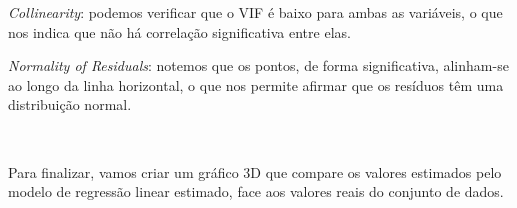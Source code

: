 \documentclass[]{article}
\begin{document}
\emph{Collinearity}: podemos verificar que o VIF é baixo para ambas as
variáveis, o que nos indica que não há correlação significativa entre
elas.

\emph{Normality of Residuals}: notemos que os pontos, de forma
significativa, alinham-se ao longo da linha horizontal, o que nos
permite afirmar que os resíduos têm uma distribuição normal.

\(\ \)

Para finalizar, vamos criar um gráfico 3D que compare os valores
estimados pelo modelo de regressão linear estimado, face aos valores
reais do conjunto de dados.

\begin{Shaded}
\begin{Highlighting}[]

\OtherTok{\textless{}{-}} \SpecialCharTok{$}\SpecialCharTok{*} 
\OtherTok{\textless{}{-}} \SpecialCharTok{$}\SpecialCharTok{*} 
\OtherTok{\textless{}{-}} \SpecialCharTok{$}\SpecialCharTok{*} 
\OtherTok{\textless{}{-}} \SpecialCharTok{$}\SpecialCharTok{*} 

\OtherTok{\textless{}{-}} 
                        \NormalTok{(} 
                                             

\OtherTok{\textless{}{-}} \NormalTok{(}
                      \NormalTok{, } \NormalTok{, } \NormalTok{,}
                      \NormalTok{, } \NormalTok{, } \NormalTok{,}
                      \NormalTok{(}\SpecialCharTok{$}\SpecialCharTok{*}\NormalTok{, }\SpecialCharTok{$}\SpecialCharTok{*}\NormalTok{),}
                      \NormalTok{, } \NormalTok{)}


\end{Highlighting}
\end{Shaded}
\end{document}
